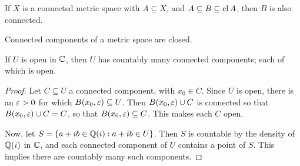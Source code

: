 \begin{lemma}\label{2.2.6}
    If $X$ is a connected metric space with  $A \subseteq X$, and  $A \subseteq
    B \subseteq \operatorname{cl}{A}$, then $B$ is also connected.
\end{lemma}
\begin{corollary}
    Connected components of a metric space are closed.
\end{corollary}

\begin{theorem}\label{2.2.7}
    If $U$ is open in  $\mathbb{C}$, then  $U$ has countably many connected components;
    each of which is open.
\end{theorem}
\begin{proof}
    Let $C \subseteq U$ a connected component, with  $x_0 \in C$. Since $U$ is
    open, there is an  $\varepsilon>0$ for which  $B(x_0,\varepsilon) \subseteq U$. Then $B(x_0,
    \varepsilon) \cup C$ is connected so that $B(x_0,\varepsilon) \cup C=C$, so that $B(x_0,\varepsilon)
    \subseteq C$. This makes each $C$ open.

    Now, let  $S=\{a+ib \in \mathbb{Q}(i) : a+ib \in U\}$. Then $S$ is countable by the
    density of  $\mathbb{Q}(i)$ in $\mathbb{C}$, and each connected component of $U$ contains a
    point of $S$. This implies there are countably many such components.
\end{proof}
